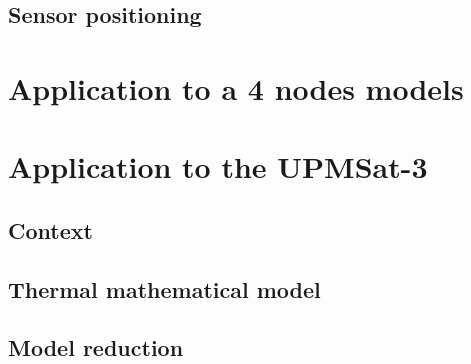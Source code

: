 \begin{itemize}
\section{Sensor positioning} 


\chapter{Application to a 4 nodes models}
\chapter{Application to the UPMSat-3}
\section{Context}
\section{Thermal mathematical model}
\section{Model reduction}

\end{itemize}
